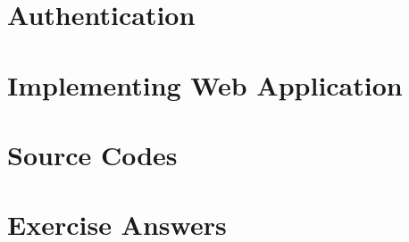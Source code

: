 \documentclass[a4paper,10pt,hidelinks]{book}
\begin{document}
    \chapter{Authentication}\label{ch:authentication}
    \minitoc
    
    

    \chapter{Implementing Web Application}\label{ch:implementing-web-application}
    \minitoc
    
    
    
    

    \appendix

    \chapter{Source Codes}\label{ch:source-codes}
    \minitoc
    
    

    \chapter{Exercise Answers}\label{ch:exercise-answers}
    \minitoc
    
    
    
    
\end{document}

